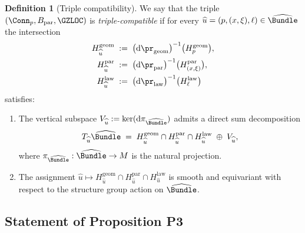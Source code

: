 \documentclass[11pt]{book}
\theoremstyle{plain}
\theoremstyle{definition}
\newtheorem{definition}[theorem]{Definition} \theoremstyle{remark}
\begin{document}
\begin{definition}[Triple compatibility]
We say that the triple
\((\Conn_p,B_{\mathrm{par}},\GZLOC)\) is \emph{triple-compatible} if
for every \(\widehat{u}=(p,(x,\xi),\ell)\in\widehat{\Bundle}\) the
intersection
\begin{align*}
  H_{\widehat{u}}^{\mathrm{geom}}
  &\;:=\;
  \bigl(\mathrm{d}\pr_{\mathrm{geom}}\bigr)^{-1}
  \bigl(H^{\mathrm{geom}}_p\bigr),\\
  H_{\widehat{u}}^{\mathrm{par}}
  &\;:=\;
  \bigl(\mathrm{d}\pr_{\mathrm{par}}\bigr)^{-1}
  \bigl(H^{\mathrm{par}}_{(x,\xi)}\bigr),\\
  H_{\widehat{u}}^{\mathrm{law}}
  &\;:=\;
  \bigl(\mathrm{d}\pr_{\mathrm{law}}\bigr)^{-1}
  \bigl(H^{\mathrm{law}}_{\ell}\bigr)
\end{align*}
satisfies:
\begin{enumerate}
  \item[(i)] The vertical subspace
    \(V_{\widehat{u}} := \ker(\mathrm{d}\pi_{\widehat{\Bundle}})\)
    admits a direct sum decomposition
    \[
      T_{\widehat{u}}\widehat{\Bundle}
      \;=\;
      H_{\widehat{u}}^{\mathrm{geom}}
      \cap
      H_{\widehat{u}}^{\mathrm{par}}
      \cap
      H_{\widehat{u}}^{\mathrm{law}}
      \;\oplus\;
      V_{\widehat{u}},
    \]
    where \(\pi_{\widehat{\Bundle}}:\widehat{\Bundle}\to M\) is the
    natural projection.
  \item[(ii)] The assignment
    \(\widehat{u}\mapsto H_{\widehat{u}}^{\mathrm{geom}}
     \cap H_{\widehat{u}}^{\mathrm{par}}
     \cap H_{\widehat{u}}^{\mathrm{law}}\)
    is smooth and equivariant with respect to the structure group
    action on \(\widehat{\Bundle}\).
\end{enumerate}
\end{definition}



\subsection*{Statement of Proposition P3}
\end{document}
